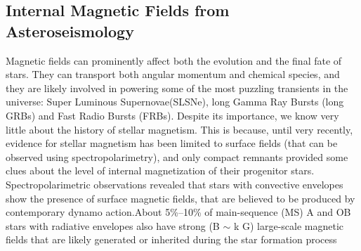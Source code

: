 {\color{red}\subsection{Internal Magnetic Fields from Asteroseismology}}
Magnetic fields can prominently affect both the evolution and the final fate of stars. They can transport both angular momentum and chemical species, and they are likely involved in powering some of the most puzzling transients in the universe: Super Luminous Supernovae(SLSNe), long Gamma Ray Bursts (long GRBs) and Fast Radio Bursts (FRBs). Despite its importance, we know very little about the history of stellar magnetism. This is  because, until very recently, evidence for stellar magnetism has been limited to surface fields (that can be observed using spectropolarimetry), and only compact remnants provided some clues about the level of internal magnetization of their progenitor stars. Spectropolarimetric observations revealed that stars with convective envelopes show the presence of surface magnetic fields, that are believed to be produced by contemporary dynamo action.About 5\%–10\% of main-sequence (MS) A and OB stars with radiative envelopes also have strong (B $\sim$ k G)
large-scale magnetic fields that are likely generated or inherited during the star
formation process  \citep[fossil fields, see e.g.,][]{2012ASPC..464..405W}